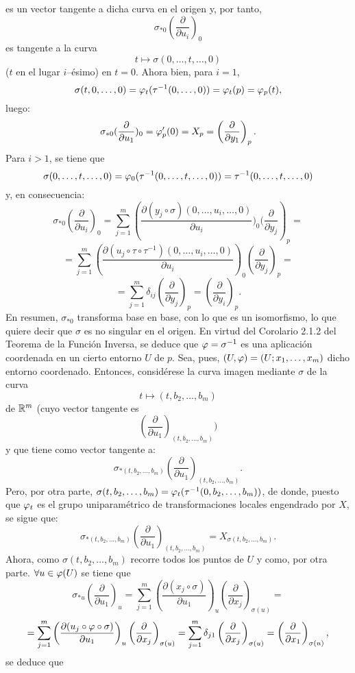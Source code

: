 \documentclass[cursovd_portada.tex]{subfiles}
\begin{document}
es un vector tangente a dicha curva en el origen y, por tanto,
$$\sigma_{*0}\left(\frac{\partial}{\partial u_i}\right)_0$$
es tangente a la curva
$$t\mapsto\sigma(0,\dots ,t,\dots ,0)$$
($t$ en el lugar $i$--ésimo) en $t=0$. Ahora bien, para $i=1$,
$$\sigma(t,0,\dots ,0)=\varphi_t(\tau^{-1}(0,\dots ,0))=\varphi_t(p)=\varphi_p(t),$$
luego:
$$\sigma_{*0}(\frac{\partial}{\partial u_1})_0=\varphi'_p(0)=X_p=\left(\frac{\partial}
{\partial y_1}\right)_p.$$ \hs Para $i>1$, se tiene que
$$\sigma(0,\dots ,t,\dots ,0)=\varphi_0(\tau^{-1}(0,\dots ,t,\dots ,0))=\tau^{-1}
(0,\dots ,t,\dots ,0)$$ y, en consecuencia:
$$\sigma_{*0}\left(\frac{\partial}{\partial u_i}\right)_0=\sum_{j=1}^m\left(\frac{\partial(y_j
\circ\sigma)(0,\dots ,u_i,\dots ,0)}{\partial u_i})_0(\frac{\partial}{\partial y_j}\right)_p=$$
$$=\sum_{j=1}^m\left(\frac{\partial(u_j\circ\tau\circ\tau^{-1})(0,\dots ,u_i,\dots ,
0)}{\partial u_i}\right)_0\left(\frac{\partial}{\partial y_j}\right)_p=$$
$$=\sum_{j=1}^m\delta_{ij}\left(\frac{\partial}{\partial y_j}\right)_p=(\frac{\partial}
{\partial y_i})_p.$$ \hs En resumen, $\sigma_{*0}$ transforma base en base, con lo que es un isomorfismo, lo que
quiere decir que $\sigma$ es no singular en el origen. En virtud del Corolario 2.1.2 del Teorema de la Función
Inversa, se deduce que $\varphi=\sigma^{-1}$ es una aplicación coordenada en un cierto entorno $U$ de $p$. Sea, pues,
$(U,\varphi)=(U;x_1,\dots ,x_m)$ dicho entorno coordenado. Entonces, considérese la curva imagen mediante $\sigma$ de
la curva
$$t\mapsto(t,b_2,\dots ,b_m)$$
de $\mathbb{R}^m$ (cuyo vector tangente es
$$\left(\frac{\partial}{\partial u_1}\right)_{(t,b_2,\dots ,b_m)})$$
y que tiene como vector tangente a:
$$\sigma_{*(t,b_2,\dots ,b_m)}\left(\frac{\partial}{\partial u_1}\right)_{(t,b_2,\dots ,
b_m)}.$$ \hs Pero, por otra parte, $\sigma(t,b_2,\dots ,b_m)=\varphi_t(\tau^{-1}(0,b_2,\dots , b_m))$, de donde,
puesto que $\varphi_t$ es el grupo uniparamétrico de transformaciones locales engendrado por $X$, se sigue que:
$$\sigma_{*(t,b_2,\dots ,b_m)}\left(\frac{\partial}{\partial u_1}\right)_{(t,b_2,\dots ,
b_m)}=X_{\sigma(t,b_2,\dots ,b_m)}.$$ \hs Ahora, como $\sigma(t,b_2,\dots ,b_m)$ recorre todos los puntos de $U$ y
como, por otra parte. $\forall u\in\varphi(U)$ se tiene que
$$\sigma_{*u}\left(\frac{\partial}{\partial u_1}\right)_u=\sum_{j=1}^m\left(\frac{\partial(x_j
\circ\sigma)}{\partial u_1}\right)_u\left(\frac{\partial}{\partial x_j}\right)_{\sigma(u)}=$$
$$=\sum_{j=1}^m\left(\frac{\partial(u_j\circ\varphi\circ\sigma)}{\partial u_1}\right)_u\left(\frac{
\partial}{\partial x_j}\right)_{\sigma(u)}=\sum_{j=1}^m\delta_{j1}\left(\frac{\partial}
{\partial x_j}\right)_{\sigma(u)}=\left(\frac{\partial}{\partial x_1}\right)_{\sigma(u)},$$ se deduce que
\end{document}
